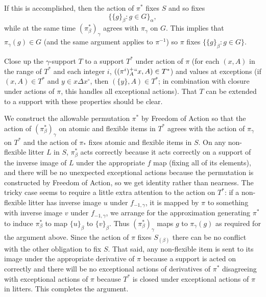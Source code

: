 \documentclass[112pt]{article}
\begin{document}
If this is accomplished, then the action of $\pi^*$ fixes $S$ and so fixes $$\{\{g\}_\beta:g \in G\}_\alpha,$$ while at the same
time $(\pi^*_\beta)_\gamma$ agrees with $\pi_\gamma$ on $G$.  This implies that $\pi_\gamma(g) \in G$ (and the same argument applies to $\pi^{-1}$)
so $\pi$ fixes $\{\{g\}_\beta:g \in G\}$.

Close up the $\gamma$-support $T$ to a support $T^*$ under action of $\pi$ (for each $(x,A)$ in the range of $T^*$ and each integer $i$, $((\pi^i)^+_A``x,A) \in T^*$) and values at exceptions
(if $(x,A) \in T^*$ and $y \in x \Delta x^\circ$, then $(\{y\},A) \in T^*$; in combination with closure under actions of $\pi$, this handles all exceptional actions).  That $T$ can be extended to a support with these properties should be clear.

We construct the allowable permutation $\pi^*$ by Freedom of Action so that the action of $(\pi^*_\beta)_\gamma$ on atomic and flexible items in $T^*$ agrees with the action of $\pi_\gamma$ on $T^*$
and the action of $\pi_*$ fixes atomic and flexible items in $S$.  On any non-flexible litter $L$ in $S$, $\pi^*_\beta$ acts correctly because it acts correctly on a support of the inverse image of $L$ under the appropriate $f$ map (fixing all of its elements), and there will be no unexpected exceptional actions because the permutation is constructed by Freedom of Action, so we get identity rather than nearness.
The tricky case seems to require a little extra attention to the action on $T^*$:  if a non-flexible litter has inverse image $u$ under $f_{-1,\gamma}$, it is mapped by $\pi$ to something with inverse image $v$ under $f_{-1,\gamma}$, we arrange for the
approximation generating $\pi^*$ to induce
$\pi^*_\beta$ to map $\{u\}_\beta$ to $\{v\}_\beta$.  Thus  $(\pi^*_\beta)_\gamma$ maps $g$ to $\pi_\gamma(g)$ as required for the argument above.  Since the action of $\pi$ fixes $S_{(\beta)}$ there can be no conflict with the other obligation to fix $S$.  That said, any non-flexible item is sent to its image under the appropriate derivative of $\pi$ because
a support is acted on correctly and there will be no exceptional actions of derivatives of $\pi^*$ disagreeing with exceptional actions of $\pi$ because $T^*$ is closed under exceptional actions of $\pi$ in litters.  This completes the argument.
\end{document}
